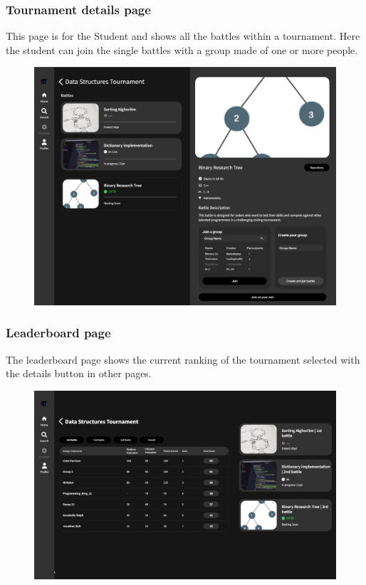 \documentclass[12pt, a4paper]{report}
\begin{document}
    \subsubsection{Tournament details page} 
    This page is for the Student and shows all the battles within a tournament. 
    Here the student can join the single battles with a group made of one or more people. 
    \begin{figure}[H]
        \centering
        \includegraphics[width=0.8\linewidth]{images/tournament_details.png}
    \end{figure}

    \subsubsection{Leaderboard page} 
    The leaderboard page shows the current ranking of the tournament selected with the details button in other pages. 
    \begin{figure}[H]
        \centering
        \includegraphics[width=0.8\linewidth]{images/leaderboard.png}
    \end{figure}
\end{document}
